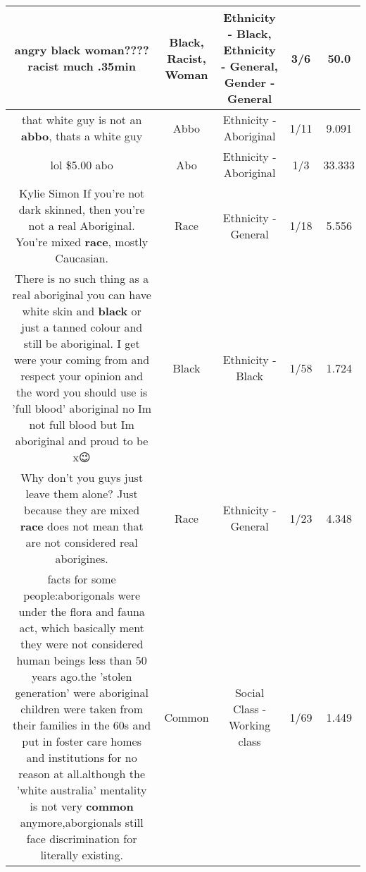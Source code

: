 \documentclass[11pt]{article}
\newlength\mylength
\begin{document}
\begin{center}
\begin{longtable}{|C{.65\mylength}|C{.30\mylength}|C{.12\mylength}|C{.12\mylength}|C{.12\mylength}|}
  \small angry \textbf{black} \textbf{woman}???? \textbf{racist} much .35min\normalsize   & Black, Racist, Woman & Ethnicity - Black, Ethnicity - General, Gender - General & 3/6 & 50.0 \\  \hline
  \small that white guy is not an \textbf{abbo}, thats a white guy\normalsize   & Abbo & Ethnicity - Aboriginal & 1/11 & 9.091 \\  \hline
  \small lol \$5.00 abo\normalsize   & Abo & Ethnicity - Aboriginal & 1/3 & 33.333 \\  \hline
  \small Kylie Simon If you're not dark skinned, then you're not a real Aboriginal. You're mixed \textbf{race}, mostly Caucasian.\normalsize   & Race & Ethnicity - General & 1/18 & 5.556 \\  \hline
  \small There is no such thing  as a  real aboriginal you can have white skin and \textbf{black} or just a tanned colour and still be aboriginal. I get were your coming from and respect your opinion and the word you should use is 'full blood' aboriginal no Im not full blood but Im aboriginal and proud to be x😉\normalsize   & Black & Ethnicity - Black & 1/58 & 1.724 \\  \hline
  \small Why don't you guys just leave them alone? Just because they are mixed \textbf{race} does not mean that are not considered real aborigines.\normalsize   & Race & Ethnicity - General & 1/23 & 4.348 \\  \hline
  \small facts for some people:aborigonals were under the flora and fauna act, which basically ment they were not considered human beings less than 50 years ago.the 'stolen generation' were aboriginal children were taken from their families in the 60s and put in foster care homes and institutions for no reason at all.although the 'white australia' mentality is not very \textbf{common} anymore,aborgionals still face discrimination for literally existing.\normalsize   & Common & Social Class - Working class & 1/69 & 1.449 \\  \hline

\end{longtable}
\end{center}
\end{document}
